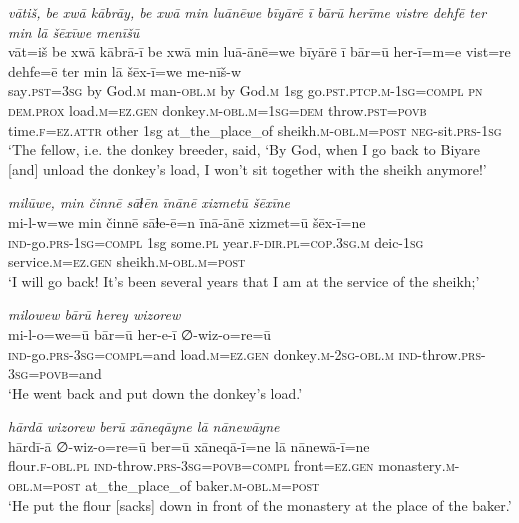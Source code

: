 \ea \label{HB.67}
\textit{vātiš, be xwā kābrāy, be xwā min luānēwe bīyārē ī bārū herīme vistre dehfē ter min lā šēxīwe menīšū} \\ 
\gll vāt=iš be xwā kābrā-ī be xwā min luā-ānē=we bīyārē ī bār=ū her-ī=m=e vist=re dehfe=ē ter min lā šēx-ī=we me-nīš-w \\ 
 say\textsc{.pst}\textsc{=3sg} by God\textsc{.m} man\textsc{-obl}\textsc{.m} by God\textsc{.m} 1sg go\textsc{.pst}\textsc{.ptcp}\textsc{.m}\textsc{-1sg}\textsc{=\textsc{compl}} \textsc{pn} \textsc{dem.prox} load\textsc{.m}\textsc{=ez}\textsc{.gen} donkey\textsc{.m}\textsc{-obl}\textsc{.m}\textsc{=1sg}\textsc{=dem} throw\textsc{.pst}\textsc{=\textsc{povb}} time\textsc{\textsc{.f}}\textsc{=ez}.\textsc{attr} other 1sg at\_the\_place\_of sheikh\textsc{.m}\textsc{-obl}\textsc{.m}\textsc{=\textsc{post}} \textsc{neg-}sit\textsc{.prs}\textsc{-1sg} \\ 
\glt `The fellow, i.e. the donkey breeder, said, ‘By God, when I go back to Biyare [and] unload the donkey’s load, I won’t sit together with the sheikh anymore!'
\z 
 
\ea \label{HB.68}
\textit{milūwe, min činnē sāɫēn īnānē xizmetū šēxīne} \\ 
\gll mi-l-w=we min činnē sāɫe-ē=n īnā-ānē xizmet=ū šēx-ī=ne \\ 
 \textsc{ind-}go\textsc{.prs}\textsc{-1sg}\textsc{=\textsc{compl}} 1sg some\textsc{.pl} year\textsc{\textsc{.f}}\textsc{-dir}\textsc{.pl}\textsc{=cop}\textsc{.3sg}\textsc{.m} deic\textsc{-1sg} service\textsc{.m}\textsc{=ez}\textsc{.gen} sheikh\textsc{.m}\textsc{-obl}\textsc{.m}\textsc{=\textsc{post}} \\ 
\glt `I will go back! It’s been several years that I am at the service of the sheikh;'
\z 
 
\ea \label{HB.72}
\textit{milowew bārū herey wizorew} \\ 
\gll mi-l-o=we=ū bār=ū her-e-ī ∅-wiz-o=re=ū \\ 
 \textsc{ind-}go\textsc{.prs}\textsc{-3sg}\textsc{=\textsc{compl}}=and load\textsc{.m}\textsc{=ez}\textsc{.gen} donkey\textsc{.m}-\textsc{2sg}\textsc{-obl}\textsc{.m} \textsc{ind-}throw\textsc{.prs}\textsc{-3sg}\textsc{=\textsc{povb}}=and \\ 
\glt `He went back and put down the donkey’s load.'
\z 
 
\ea \label{HB.73}
\textit{hārdā wizorew berū xāneqāyne lā nānewāyne} \\ 
\gll hārdī-ā ∅-wiz-o=re=ū ber=ū xāneqā-ī=ne lā nānewā-ī=ne \\ 
 flour\textsc{\textsc{.f}}\textsc{-obl}\textsc{.pl} \textsc{ind-}throw\textsc{.prs}\textsc{-3sg}\textsc{=\textsc{povb}}=\textsc{compl} front\textsc{=ez}\textsc{.gen} monastery\textsc{.m}\textsc{-obl}\textsc{.m}\textsc{=\textsc{post}} at\_the\_place\_of baker\textsc{.m}\textsc{-obl}\textsc{.m}\textsc{=\textsc{post}} \\ 
\glt `He put the flour [sacks] down in front of the monastery at the place of the baker.'
\z 
 
